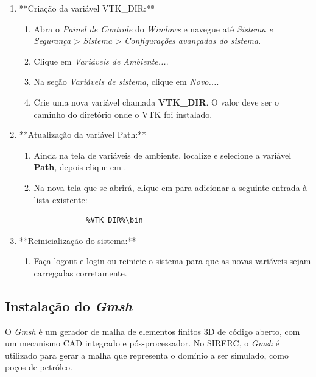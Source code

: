 \documentclass[a4paper,11pt]{article}
\newcommand{\sistema}{\textsf{SIRERC}}
\newcommand{\gmsh}{\textit{Gmsh}}
\newcommand{\windows}{\textit{Windows}}
\begin{document}
\begin{enumerate}
	\item **Criação da variável VTK\_DIR:**
	\begin{enumerate}
		\item Abra o \textit{Painel de Controle} do \windows{} e navegue até \textit{Sistema e Segurança} > \textit{Sistema} > \textit{Configurações avançadas do sistema}.
		\item Clique em \textit{Variáveis de Ambiente...}.
		\item Na seção \textit{Variáveis de sistema}, clique em \textit{Novo...}.
		\item Crie uma nova variável chamada \textbf{VTK\_DIR}. O valor deve ser o caminho do diretório onde o VTK foi instalado. 
	\end{enumerate}
	
	\item **Atualização da variável Path:**
	\begin{enumerate}
		\item Ainda na tela de variáveis de ambiente, localize e selecione a variável \textbf{Path}, depois clique em .
		\item Na nova tela que se abrirá, clique em  para adicionar a seguinte entrada à lista existente:
		\begin{mdframed}
		\begin{verbatim}
			%VTK_DIR%\bin
		\end{verbatim}
		\end{mdframed}
	\end{enumerate}
	
	\item **Reinicialização do sistema:**
	\begin{enumerate}
		\item Faça logout e login ou reinicie o sistema para que as novas variáveis sejam carregadas corretamente.
	\end{enumerate}
\end{enumerate}

\newpage
\subsection{Instalação do \gmsh{}}

O \gmsh{} é um gerador de malha de elementos finitos 3D de código aberto, com um mecanismo CAD integrado e pós-processador. No \sistema{}, o \gmsh{} é utilizado para gerar a malha que representa o domínio a ser simulado, como poços de petróleo.
\end{document}
